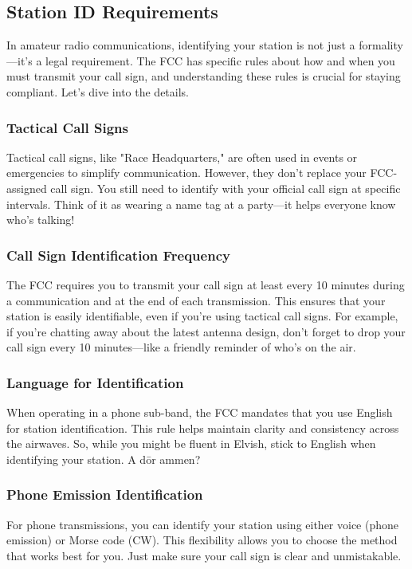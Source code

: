 \subsection{Station ID Requirements}
\label{subsec:id-requirements}

In amateur radio communications, identifying your station is not just a formality—it's a legal requirement. The FCC has specific rules about how and when you must transmit your call sign, and understanding these rules is crucial for staying compliant. Let's dive into the details.

\subsubsection*{Tactical Call Signs}
Tactical call signs, like "Race Headquarters," are often used in events or emergencies to simplify communication. However, they don't replace your FCC-assigned call sign. You still need to identify with your official call sign at specific intervals. Think of it as wearing a name tag at a party—it helps everyone know who's talking!

\subsubsection*{Call Sign Identification Frequency}
The FCC requires you to transmit your call sign at least every 10 minutes during a communication and at the end of each transmission. This ensures that your station is easily identifiable, even if you're using tactical call signs. For example, if you're chatting away about the latest antenna design, don't forget to drop your call sign every 10 minutes—like a friendly reminder of who's on the air.

\subsubsection*{Language for Identification}
When operating in a phone sub-band, the FCC mandates that you use English for station identification. This rule helps maintain clarity and consistency across the airwaves. So, while you might be fluent in Elvish, stick to English when identifying your station.  A dōr ammen?

\subsubsection*{Phone Emission Identification}
For phone transmissions, you can identify your station using either voice (phone emission) or Morse code (CW). This flexibility allows you to choose the method that works best for you. Just make sure your call sign is clear and unmistakable.

